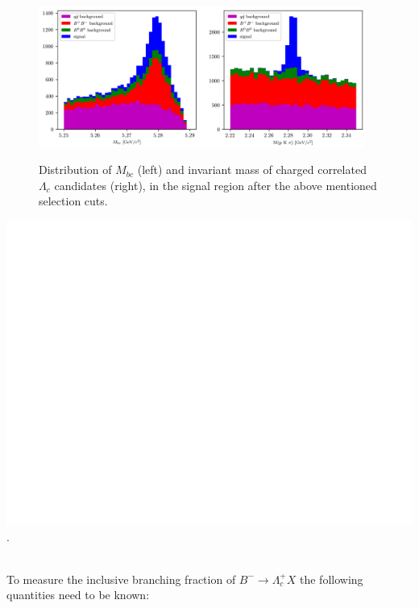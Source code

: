 \begin{figure}[h!]
{\includegraphics[width=0.95\textwidth]{04-chargedCorrBtoLambda/figs/Mbc_InvM_optimizedSelection_SigR.png}}
\caption{Distribution of $M_{bc} $ (left) and invariant mass of charged correlated $\Lambda_c$  candidates (right), in the signal region after the above mentioned selection cuts.}
\label{fig:Mbc_InvM_optimizedSelection_SigR}
\end{figure}

\mbox{\includegraphics[width=.8\textwidth]{04-chargedCorrBtoLambda/figs/blank.png}} %
\vfill
%
\vspace*{10.5cm}
.\\

\mbox{~}

To measure the inclusive branching fraction of $B^-  \rightarrow \Lambda_c^+ X$ the following quantities need to be known: 

